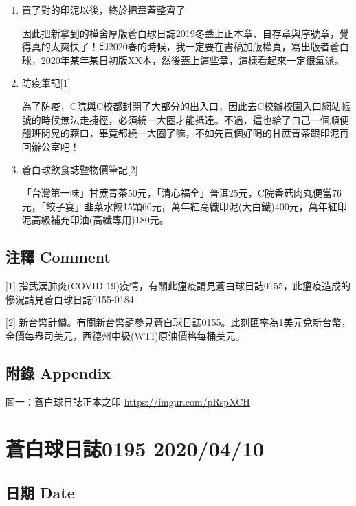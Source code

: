 \documentclass[a5paper, 12pt
]{book}
\begin{document}
\begin{enumerate}
\def\labelenumi{\arabic{enumi}.}
\item
  買了對的印泥以後，終於把章蓋整齊了

  因此把新拿到的樺舍厚版蒼白球日誌2019冬蓋上正本章、自存章與序號章，覺得真的太爽快了！印2020春的時候，我一定要在書稿加版權頁，寫出版者蒼白球，2020年某年某日初版XX本，然後蓋上這些章，這樣看起來一定很氣派。
\item
  防疫筆記{[}1{]}

  為了防疫，C院與C校都封閉了大部分的出入口，因此去C校辦校園入口網站帳號的時候無法走捷徑，必須繞一大圈才能抵達。不過，這也給了自己一個順便翹班閒晃的藉口，畢竟都繞一大圈了嘛，不如先買個好喝的甘蔗青茶跟印泥再回辦公室吧！
\item
  蒼白球飲食誌暨物價筆記{[}2{]}

  「台灣第一味」甘蔗青茶50元，「清心福全」普洱25元，C院香菇肉丸便當76元，「餃子宴」韭菜水餃15顆60元，萬年紅高纖印泥(大白鐵)400元，萬年紅印泥高級補充印油(高纖專用)180元。
\end{enumerate}

\hypertarget{ux6ce8ux91cb-comment-39}{%
\subsection{注釋 Comment}\label{ux6ce8ux91cb-comment-39}}

{[}1{]}
指武漢肺炎(COVID-19)疫情，有關此瘟疫請見蒼白球日誌0155，此瘟疫造成的慘況請見蒼白球日誌0155-0184

{[}2{]}
新台幣計價。有關新台幣請參見蒼白球日誌0155。此刻匯率為1美元兌新台幣，金價每盎司美元，西德州中級(WTI)原油價格每桶美元。

\hypertarget{ux9644ux9304-appendix-39}{%
\subsection{附錄 Appendix}\label{ux9644ux9304-appendix-39}}

圖一：蒼白球日誌正本之印 \url{https://imgur.com/pRspXCH}

\hypertarget{ux84bcux767dux7403ux65e5ux8a8c0195-20200410}{%
\section{蒼白球日誌0195
2020/04/10}\label{ux84bcux767dux7403ux65e5ux8a8c0195-20200410}}

\hypertarget{ux65e5ux671f-date-40}{%
\subsection{日期 Date}\label{ux65e5ux671f-date-40}}
\end{document}
